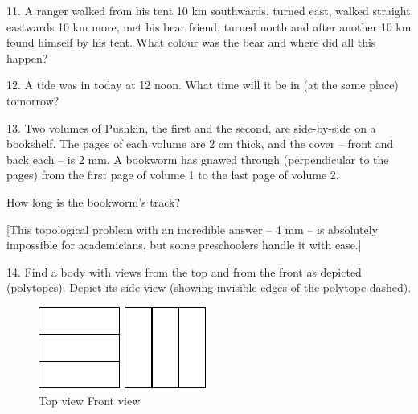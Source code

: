 \begin{problem}{11.}
	A ranger walked from his tent 10 km southwards, turned east, walked straight eastwards 10 km more,
	met his bear friend, turned north and after another 10 km found himself by his tent. What colour was the bear
	and where did all this happen?
\end{problem}

\begin{problem}{12.}
	A tide was in today at 12 noon. What time will it be in (at the same place) tomorrow?
\end{problem}

\begin{problem}{13.}
	Two volumes of Pushkin, the first and the second, are side-by-side on a bookshelf. The pages of each
	volume are 2 cm thick, and the cover -- front and back each -- is 2 mm. A bookworm has gnawed through
	(perpendicular to the pages) from the first page of volume 1 to the last page of volume 2.

	How long is the bookworm's track?

	[This topological problem with an incredible answer -- 4 mm -- is absolutely impossible for academicians,
	but some preschoolers handle it with ease.]
\end{problem}

\begin{problem}{14.}
	Find a body with views from the top and from the front as depicted (polytopes).
	Depict its side view (showing invisible edges of the polytope dashed).
	\begin{figure}[h]
	\centering
	\footnotesize
	\includegraphics[scale=1]{taskbook-99} \qquad\qquad
	\includegraphics[scale=1]{taskbook-98}
	\\[2pt]
	\hspace{1pt} 
	Top view
	\hspace{43pt} Front view
	\end{figure}
\end{problem}

